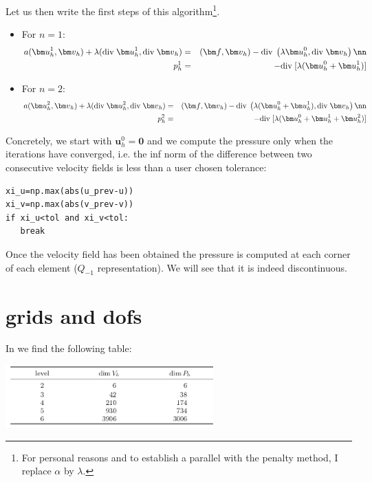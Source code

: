 Let us then write the first steps of this algorithm\footnote{For personal reasons
and to establish a parallel with the penalty method, I replace $\alpha$ by $\lambda$.}.
\begin{itemize}
\item
For $n=1$:
\begin{eqnarray}
a({\bm u}_h^1,{\bm v}_h) + \lambda (\text{div}\; {\bm u}_h^1, \text{div}\; {\bm v}_h) 
&=& ({\bm f} , {\bm v}_h) - \text{div}\; \left( \lambda {\bm u}_h^0 , \text{div}\; {\bm v}_h \right) \nn\\
p_h^1 &=& - \text{div}\; [\lambda ( {\bm u}_h^0 + {\bm u}_h^1 )]
\end{eqnarray}
\item 
For $n=2$:
\begin{eqnarray}
a({\bm u}_h^2,{\bm v}_h) + \lambda (\text{div}\; {\bm u}_h^2, \text{div}\; {\bm v}_h) 
&=& ({\bm f} , {\bm v}_h) - \text{div}\; \left( \lambda ({\bm u}_h^0 +{\bm u}_h^1 ), \text{div}\; {\bm v}_h \right) \nn\\
p_h^2 &=& - \text{div}\; [\lambda ( {\bm u}_h^0 + {\bm u}_h^1 + {\bm u}_h^2)]
\end{eqnarray}
\end{itemize}

Concretely, we start with ${\bm u}_h^0={\bm 0}$ and we compute the pressure only when the 
iterations have converged, i.e. the inf norm of the difference between two consecutive 
velocity fields is less than a user chosen tolerance:
\begin{lstlisting}
xi_u=np.max(abs(u_prev-u))
xi_v=np.max(abs(v_prev-v))
if xi_u<tol and xi_v<tol:
   break
\end{lstlisting}

Once the velocity field has been obtained the pressure is computed 
at each corner of each element ($Q_{-1}$ representation).
We will see that it is indeed discontinuous.


\newpage
\section*{grids and dofs}

In \cite{huzh11} we find the following table:

\begin{center}
\includegraphics[width=8cm]{python_codes/fieldstone_161/images/dofs}
\end{center}

